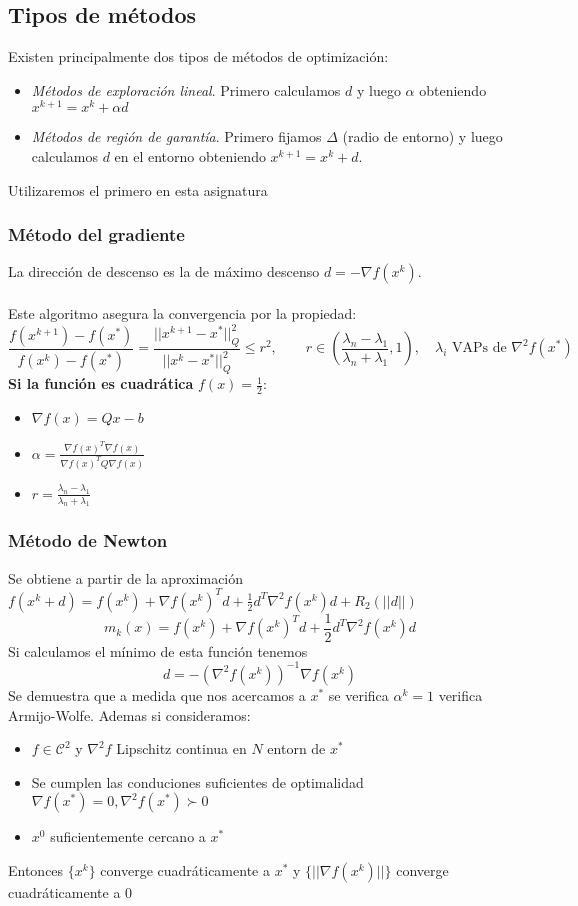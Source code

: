 \documentclass[leqno]{article}
\newcommand{\norm}[1]{\lvert \lvert #1 \rvert \rvert }
\newcommand{\N}{\nabla}
\begin{document}
\subsection{Tipos de métodos}
Existen principalmente dos tipos de métodos de optimización:
\begin{itemize}
    \item \textit{Métodos de exploración lineal}. Primero calculamos $d$ y luego $\alpha $ obteniendo $x^{k+1} = x^{k} + \alpha d$
    \item \textit{Métodos de región de garantía}. Primero fijamos $\Delta$ (radio de entorno) y luego calculamos $d$ en el entorno obteniendo $x^{k+1} = x^k + d$.
\end{itemize}
Utilizaremos el primero en esta asignatura

\subsubsection{Método del gradiente}
La dirección de descenso es la de máximo descenso $d = -\N f(x^k)$.\\
\\
Este algoritmo asegura la convergencia por la propiedad:
$$
\frac{f(x^{k+1}) - f(x^*)}{f(x^{k}) - f(x^*)} = \frac{\norm{x^{k+1}-x^*}^2_Q}{\norm{x^{k}-x^*}^2_Q} \leq r^2 , \qquad r \in \left( \frac{\lambda_n - \lambda_1}{\lambda_n + \lambda_1}, 1 \right), \quad \lambda_i \text{ VAPs de } \N^2 f(x^*)
$$
\textbf{Si la función es cuadrática} $f(x) = \frac{1}{2}$:
\begin{itemize}
\item $\N f(x) = Qx - b$
\item $\displaystyle \alpha = \frac{\N f(x)^T \N f(x)}{\N f(x)^TQ\N f(x)}$
\item $r = \displaystyle \frac{\lambda_n - \lambda_1}{\lambda_n + \lambda_1}$ 
\end{itemize}



\subsubsection{Método de Newton}
Se obtiene a partir de la aproximación $f(x^k + d) = f(x^k) + \N f(x^k)^Td + \frac{1}{2}d^T\N^2f(x^k)d + R_2(\norm{d})$
$$
m_k(x) = f(x^k) + \N f(x^k)^Td + \frac{1}{2}d^T\N^2f(x^k)d
$$
Si calculamos el mínimo de esta función tenemos
$$
d = -(\N^2f(x^k))^{-1}\N f(x^k)
$$
Se demuestra que a medida que nos acercamos a $x^*$ se verifica $\alpha^k=1$ verifica Armijo-Wolfe. Ademas si consideramos:
\begin{itemize}
    \item $f\in \mathcal{C}^2$ y $\N^2 f$ Lipschitz continua en $N$ entorn de $x^*$
    \item Se cumplen las conduciones suficientes de optimalidad $\N f(x^*)=0, \N^2 f(x^*)\succ 0$
    \item $x^0$ suficientemente cercano a $x^*$
\end{itemize}
Entonces $\{x^k\}$ converge cuadráticamente a $x^*$ y $\{\norm{\N f(x^k)}\}$ converge cuadráticamente a $0$
\end{document}
